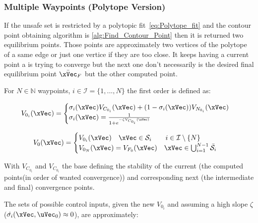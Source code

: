 \subsubsection{Multiple Waypoints (Polytope Version)}
\label{subsubsubsec:CLFs_Summed_Algorithm_multiple_waypoints}

If the unsafe set is restricted by a polytopic fit~\ref{eq:Polytope_fit} and the contour point obtaining algorithm is \ref{alg:Find_Contour_Point} then it is returned two equilibrium points. Those points are approximately two vertices of the polytope of a same edge or just one vertice if they are too close.  It keeps having a current point a  is trying to converge but the next one don't necessarily is the desired final equilibrium point \(\bar{\xVec}_F\) but the other computed point.\par
For \(N \in \mathbb{N}\) waypoints, \(i \in \mathcal{I}=\{1,...,N\}\) the first order  is defined as:

\begin{align}
    V_{0_i}(\xVec) = 
    \begin{cases}
        \sigma_i(\xVec) V_{C_{0_i}}(\xVec) + (1 - \sigma_i(\xVec))V_{N_{0_i}}(\xVec) \\
        \sigma_i(\xVec) = \frac{1}{1+e^{-\zeta V_{C_{0_i}}(\xVec)}} 
    \end{cases}
    \label{eq:1stPhase_2-CLF-S_multiple_waypoints}
\end{align}

\begin{align}
    V_0(\xVec) = 
    \begin{cases}
        V_{0_i}(\xVec) \quad \xVec \in \mathcal{S}_i \qquad i \in \mathcal{I}\setminus\{N\}\\
        V_{0_N}(\xVec) = V_{F_0}(\xVec) \quad \xVec \in \bigcup_{i = 1}^{N-1} \bar{\mathcal{S}}_i
    \end{cases}
    \label{eq:New_2-CLF-S_multiple_waypoints}
\end{align}


With \(V_{C_{0_i}}\) and \(V_{C_{0_i}}\) the base  defining the stability of the current (the computed points(in order of wanted convergence)) and corresponding next (the intermediate and final) convergence points. \par
The sets of possible control inputs, given the new  \(V_{0_i}\) and assuming a high slope \(\zeta\) (\(\dot{\sigma_i}(\xVec, \uVec_0)\approx 0\)),  are approximately:

